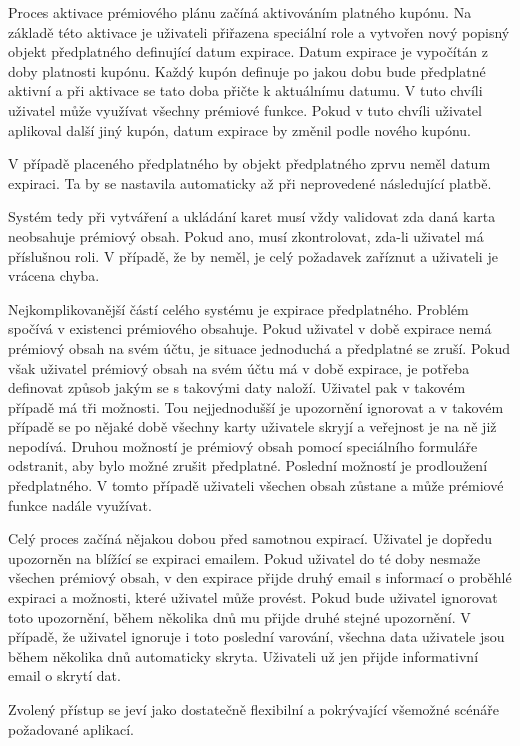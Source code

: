 		Proces aktivace prémiového plánu začíná aktivováním platného kupónu.
		Na základě této aktivace je uživateli přiřazena speciální role a vytvořen nový popisný objekt předplatného
		definující datum expirace.
		Datum expirace je vypočítán z doby platnosti kupónu.
		Každý kupón definuje po jakou dobu bude předplatné aktivní a při aktivace se tato doba přičte k aktuálnímu datumu.
		V tuto chvíli uživatel může využívat všechny prémiové funkce.
		Pokud v tuto chvíli uživatel aplikoval další jiný kupón, datum expirace by změnil podle nového kupónu.

		V případě placeného předplatného by objekt předplatného zprvu neměl datum expiraci.
		Ta by se nastavila automaticky až při neprovedené následující platbě.

		Systém tedy při vytváření a ukládání karet musí vždy validovat zda daná karta neobsahuje prémiový obsah.
		Pokud ano, musí zkontrolovat, zda-li uživatel má příslušnou roli.
		V případě, že by neměl, je celý požadavek zaříznut a uživateli je vrácena chyba.

		Nejkomplikovanější částí celého systému je expirace předplatného.
		Problém spočívá v existenci prémiového obsahuje.
		Pokud uživatel v době expirace nemá prémiový obsah na svém účtu, je situace jednoduchá a předplatné se zruší.
		Pokud však uživatel prémiový obsah na svém účtu má v době expirace, je potřeba definovat způsob jakým se
		s takovými daty naloží.
		Uživatel pak v takovém případě má tři možnosti.
		Tou nejjednodušší je upozornění ignorovat a v takovém případě se po nějaké době všechny karty uživatele skryjí
		a veřejnost je na ně již nepodívá.
		Druhou možností je prémiový obsah pomocí speciálního formuláře odstranit, aby bylo možné zrušit předplatné.
		Poslední možností je prodloužení předplatného.
		V tomto případě uživateli všechen obsah zůstane a může prémiové funkce nadále využívat.

		Celý proces začíná nějakou dobou před samotnou expirací.
		Uživatel je dopředu upozorněn na blížící se expiraci emailem.
		Pokud uživatel do té doby nesmaže všechen prémiový obsah, v den expirace přijde druhý email s informací o
		proběhlé expiraci a možnosti, které uživatel může provést.
		Pokud bude uživatel ignorovat toto upozornění, během několika dnů mu přijde druhé stejné upozornění.
		V případě, že uživatel ignoruje i toto poslední varování, všechna data uživatele jsou během několika dnů
		automaticky skryta.
		Uživateli už jen přijde informativní email o skrytí dat.

		Zvolený přístup se jeví jako dostatečně flexibilní a pokrývající všemožné scénáře požadované aplikací.

